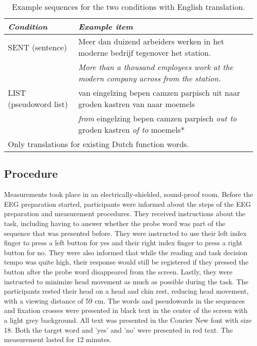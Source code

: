 \begin{table}[ht]
    \captionsetup{justification=raggedright, singlelinecheck=false, font = normal} %
    \renewcommand{\arraystretch}{1.5} %
    \caption{Example sequences for the two conditions with English translation.}
    \label{tab:example_sequences}
    \small
    \begin{tabular}{lp{12cm}}
    \hline
    \textit{Condition} & \textit{Example item} \\
    \hline
    SENT (sentence) & Meer dan duizend arbeiders werken in het moderne bedrijf tegenover het station. \\
     & \textit{More than a thousand employees work at the modern company across from the station.} \\
    LIST (pseudoword list) & van eingelzing bepen camzen parpisch uit naar groden kastren van naar moemels \\
     & \textit{from} eingelzing bepen camzen parpisch \textit{out to} groden kastren \textit{of to} moemels* \\
    \hline
    \multicolumn{2}{l}{\footnotesize *Only translations for existing Dutch function words.} \\
    \end{tabular}
    \normalsize
\end{table}



\subsection{Procedure}
Measurements took place in an electrically-shielded, sound-proof room. Before the EEG preparation started, participants were informed about the steps of the EEG preparation and measurement procedures. They received instructions about the task, including having to answer whether the probe word was part of the sequence that was presented before. They were instructed to use their left index finger to press a left button for yes and their right index finger to press a right button for no. They were also informed that while the reading and task decision tempo was quite high, their response would still be registered if they pressed the button after the probe word disappeared from the screen. Lastly, they were instructed to minimize head movement as much as possible during the task. The participants rested their head on a head and chin rest, reducing head movement, with a viewing distance of 59 cm. The words and pseudowords in the sequences and fixation crosses were presented in black text in the center of the screen with a light grey background. All text was presented in the Courier New font with size 18. Both the target word and 'yes' and 'no' were presented in red text. The measurement lasted for 12 minutes. 

